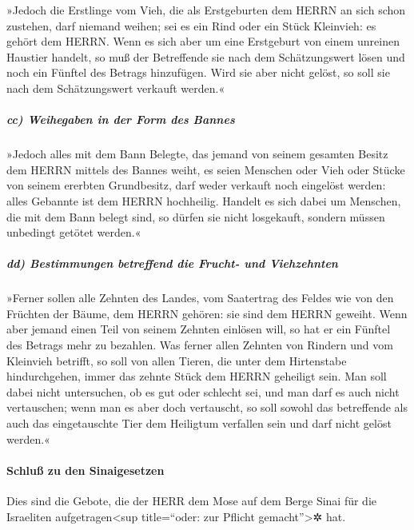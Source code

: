 »Jedoch die Erstlinge vom Vieh, die als Erstgeburten dem
HERRN an sich schon zustehen, darf niemand weihen; sei es ein Rind oder
ein Stück Kleinvieh: es gehört dem HERRN. Wenn es sich
aber um eine Erstgeburt von einem unreinen Haustier handelt, so muß der
Betreffende sie nach dem Schätzungswert lösen und noch ein Fünftel des
Betrags hinzufügen. Wird sie aber nicht gelöst, so soll sie nach dem
Schätzungswert verkauft werden.«

\hypertarget{cc-weihegaben-in-der-form-des-bannes}{%
\subparagraph{cc) Weihegaben in der Form des
Bannes}\label{cc-weihegaben-in-der-form-des-bannes}}

»Jedoch alles mit dem Bann Belegte, das jemand von seinem
gesamten Besitz dem HERRN mittels des Bannes weiht, es seien Menschen
oder Vieh oder Stücke von seinem ererbten Grundbesitz, darf weder
verkauft noch eingelöst werden: alles Gebannte ist dem HERRN hochheilig.
Handelt es sich dabei um Menschen, die mit dem Bann
belegt sind, so dürfen sie nicht losgekauft, sondern müssen unbedingt
getötet werden.«

\hypertarget{dd-bestimmungen-betreffend-die-frucht--und-viehzehnten}{%
\subparagraph{dd) Bestimmungen betreffend die Frucht- und
Viehzehnten}\label{dd-bestimmungen-betreffend-die-frucht--und-viehzehnten}}

»Ferner sollen alle Zehnten des Landes, vom Saatertrag
des Feldes wie von den Früchten der Bäume, dem HERRN gehören: sie sind
dem HERRN geweiht. Wenn aber jemand einen Teil von seinem
Zehnten einlösen will, so hat er ein Fünftel des Betrags mehr zu
bezahlen. Was ferner allen Zehnten von Rindern und vom
Kleinvieh betrifft, so soll von allen Tieren, die unter dem Hirtenstabe
hindurchgehen, immer das zehnte Stück dem HERRN geheiligt sein.
Man soll dabei nicht untersuchen, ob es gut oder schlecht
sei, und man darf es auch nicht vertauschen; wenn man es aber doch
vertauscht, so soll sowohl das betreffende als auch das eingetauschte
Tier dem Heiligtum verfallen sein und darf nicht gelöst werden.«

\hypertarget{schluuxdf-zu-den-sinaigesetzen}{%
\paragraph{Schluß zu den
Sinaigesetzen}\label{schluuxdf-zu-den-sinaigesetzen}}

Dies sind die Gebote, die der HERR dem Mose auf dem Berge
Sinai für die Israeliten aufgetragen\textless sup title=``oder: zur
Pflicht gemacht''\textgreater✲ hat.
